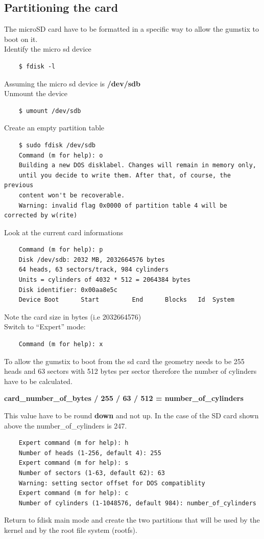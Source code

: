 \documentclass[11pt]{report} %
\begin{document}
	\subsection{Partitioning the card}
		The microSD card have to be formatted in a specific way to allow the
		gumstix to boot on it.
		\\
		Identify the micro sd device
\begin{lstlisting}
	$ fdisk -l
\end{lstlisting}
		Assuming the micro sd device is {\bf /dev/sdb}\\
		Unmount the device
\begin{lstlisting}
	$ umount /dev/sdb
\end{lstlisting}
		Create an empty partition table
\begin{lstlisting}
	$ sudo fdisk /dev/sdb
	Command (m for help): o
	Building a new DOS disklabel. Changes will remain in memory only,
	until you decide to write them. After that, of course, the previous
	content won't be recoverable.
	Warning: invalid flag 0x0000 of partition table 4 will be corrected by w(rite)
\end{lstlisting}
		Look at the current card informations
\begin{lstlisting}
	Command (m for help): p
	Disk /dev/sdb: 2032 MB, 2032664576 bytes
	64 heads, 63 sectors/track, 984 cylinders
	Units = cylinders of 4032 * 512 = 2064384 bytes
	Disk identifier: 0x00aa8e5c
	Device Boot      Start         End      Blocks   Id  System
\end{lstlisting}
		Note the card size in bytes (i.e 2032664576)\\
		Switch to ``Expert'' mode:
\begin{lstlisting}
	Command (m for help): x
\end{lstlisting}
		To allow the gumstix to boot from the sd card the geometry needs to be
		255 heads and 63 sectors with 512 bytes per sector therefore the number
		of cylinders have to be calculated.\\
		\begin{center}
			{\bf card\_number\_of\_bytes / 255 / 63 / 512 = number\_of\_cylinders}
		\end{center}
		This value have to be round {\bf down} and not up. In the case of the
		SD card shown above the number\_of\_cylinders is 247.
\begin{lstlisting}
	Expert command (m for help): h
	Number of heads (1-256, default 4): 255
	Expert command (m for help): s
	Number of sectors (1-63, default 62): 63
	Warning: setting sector offset for DOS compatiblity
	Expert command (m for help): c
	Number of cylinders (1-1048576, default 984): number_of_cylinders
\end{lstlisting}
		Return to fdisk main mode and create the two partitions that will be
		used by the kernel and by the root file system (rootfs).\\
\end{document}
